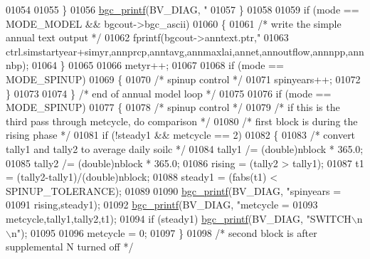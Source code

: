 \begin{DoxyCode}
{{{{{{{{{{{{{{{{{{{{{{{{{{{{{{{{{{{{{{{{{{{{{{01054                 
01055             \}
01056             \hyperlink{bgc__io_8c_af287cce6e2aede1ce337de9319e80d0d}{bgc\_printf}(BV\_DIAG, \textcolor{stringliteral}{"%
01057         \}
01058         
01059         \textcolor{keywordflow}{if} (mode == MODE\_MODEL && bgcout->bgc\_ascii)
01060         \{
01061             \textcolor{comment}{/* write the simple annual text output */}
01062             fprintf(bgcout->anntext.ptr,\textcolor{stringliteral}{"%
01063                 ctrl.simstartyear+simyr,annprcp,anntavg,annmaxlai,annet,annoutflow,annnpp,annnbp);
01064         \}
01065             
01066         metyr++;
01067 
01068         \textcolor{keywordflow}{if} (mode == MODE\_SPINUP)
01069         \{
01070             \textcolor{comment}{/* spinup control */}
01071             spinyears++;
01072         \}
01073 
01074     \}   \textcolor{comment}{/* end of annual model loop */}
01075 
01076     \textcolor{keywordflow}{if} (mode == MODE\_SPINUP)
01077     \{
01078         \textcolor{comment}{/* spinup control */}
01079         \textcolor{comment}{/* if this is the third pass through metcycle, do comparison */}
01080         \textcolor{comment}{/* first block is during the rising phase */}
01081         \textcolor{keywordflow}{if} (!steady1 && metcycle == 2)
01082         \{
01083             \textcolor{comment}{/* convert tally1 and tally2 to average daily soilc */}
01084             tally1 /= (double)nblock * 365.0;
01085             tally2 /= (double)nblock * 365.0;
01086             rising = (tally2 > tally1);
01087             t1 = (tally2-tally1)/(\textcolor{keywordtype}{double})nblock;
01088             steady1 = (fabs(t1) < SPINUP\_TOLERANCE);
01089 
01090             \hyperlink{bgc__io_8c_af287cce6e2aede1ce337de9319e80d0d}{bgc\_printf}(BV\_DIAG, \textcolor{stringliteral}{"spinyears = %
01091                 rising,steady1);
01092             \hyperlink{bgc__io_8c_af287cce6e2aede1ce337de9319e80d0d}{bgc\_printf}(BV\_DIAG, \textcolor{stringliteral}{"metcycle = %
01093                 metcycle,tally1,tally2,t1);
01094             \textcolor{keywordflow}{if} (steady1) \hyperlink{bgc__io_8c_af287cce6e2aede1ce337de9319e80d0d}{bgc\_printf}(BV\_DIAG, \textcolor{stringliteral}{"SWITCH\(\backslash\)n\(\backslash\)n"});
01095 
01096             metcycle = 0;
01097         \}
01098         \textcolor{comment}{/* second block is after supplemental N turned off */}
}}}}}}}}}}}}}}}}}}}}}}}}}}}}}}}}}}}}}}}}}}}}}}}}}}
\end{DoxyCode}
